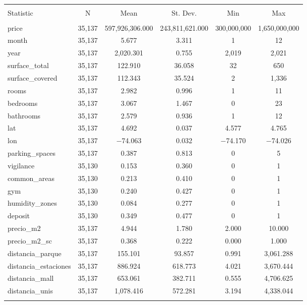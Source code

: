
\begin{table}[!htbp] \centering 
  \caption{} 
  \label{} 
\begin{tabular}{@{\extracolsep{5pt}}lccccc} 
\\[-1.8ex]\hline 
\hline \\[-1.8ex] 
Statistic & \multicolumn{1}{c}{N} & \multicolumn{1}{c}{Mean} & \multicolumn{1}{c}{St. Dev.} & \multicolumn{1}{c}{Min} & \multicolumn{1}{c}{Max} \\ 
\hline \\[-1.8ex] 
price & 35,137 & 597,926,306.000 & 243,811,621.000 & 300,000,000 & 1,650,000,000 \\ 
month & 35,137 & 5.677 & 3.311 & 1 & 12 \\ 
year & 35,137 & 2,020.301 & 0.755 & 2,019 & 2,021 \\ 
surface\_total & 35,137 & 122.910 & 36.058 & 32 & 650 \\ 
surface\_covered & 35,137 & 112.343 & 35.524 & 2 & 1,336 \\ 
rooms & 35,137 & 2.982 & 0.996 & 1 & 11 \\ 
bedrooms & 35,137 & 3.067 & 1.467 & 0 & 23 \\ 
bathrooms & 35,137 & 2.579 & 0.936 & 1 & 12 \\ 
lat & 35,137 & 4.692 & 0.037 & 4.577 & 4.765 \\ 
lon & 35,137 & $-$74.063 & 0.032 & $-$74.170 & $-$74.026 \\ 
parking\_spaces & 35,137 & 0.387 & 0.813 & 0 & 5 \\ 
vigilance & 35,130 & 0.153 & 0.360 & 0 & 1 \\ 
common\_areas & 35,130 & 0.213 & 0.410 & 0 & 1 \\ 
gym & 35,130 & 0.240 & 0.427 & 0 & 1 \\ 
humidity\_zones & 35,130 & 0.084 & 0.277 & 0 & 1 \\ 
deposit & 35,130 & 0.349 & 0.477 & 0 & 1 \\ 
precio\_m2 & 35,137 & 4.944 & 1.780 & 2.000 & 10.000 \\ 
precio\_m2\_sc & 35,137 & 0.368 & 0.222 & 0.000 & 1.000 \\ 
distancia\_parque & 35,137 & 155.101 & 93.857 & 0.991 & 3,061.288 \\ 
distancia\_estaciones & 35,137 & 886.924 & 618.773 & 4.021 & 3,670.444 \\ 
distancia\_mall & 35,137 & 653.061 & 382.711 & 0.555 & 4,706.625 \\ 
distancia\_unis & 35,137 & 1,078.416 & 572.281 & 3.194 & 4,338.044 \\ 
\hline \\[-1.8ex] 
\end{tabular} 
\end{table} 
